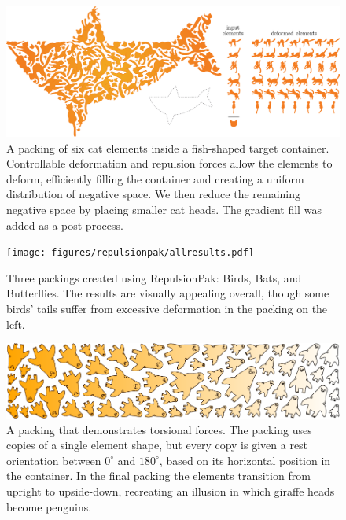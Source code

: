 \begin{figure}
  \centering
  \includegraphics[width=1.0\textwidth]{figures/repulsionpak/cat_whale_04}
  \caption[A packing of a cat]
  {
  \label{cat_packing}
           A packing of six cat elements inside a fish-shaped target container. 
           Controllable deformation and repulsion forces allow the elements to deform,
           efficiently filling the container and creating a uniform distribution of
           negative space. We then reduce the remaining negative space by placing smaller
           cat heads. The gradient fill was added as a post-process.}
\end{figure}

\begin{figure}
\centering
\texttt{[image: figures/repulsionpak/allresults.pdf]} 
\caption[Three packings created using RepulsionPak: Birds, Bats, and Butterflies]
{\label{three_packings} Three packings created using RepulsionPak: \newline Birds, Bats, and Butterflies. The results are visually appealing overall,
though some birds' tails suffer from excessive deformation in
the packing on the left.}
\end{figure}

\begin{figure}
\centering
\includegraphics[width=1.0\textwidth]{figures/repulsionpak/giraffe_penguin.pdf}
\caption[A packing that demonstrates torsional forces]
{\label{giraffe_penguin_packing}
A packing that demonstrates torsional forces.
The packing uses copies of a single element shape, but every copy is given a rest orientation between $0^\circ$
and $180^\circ$, based on its horizontal position in the container.  In the final packing the elements transition
from upright to upside-down, recreating an illusion in which giraffe heads become penguins.}
\end{figure}

